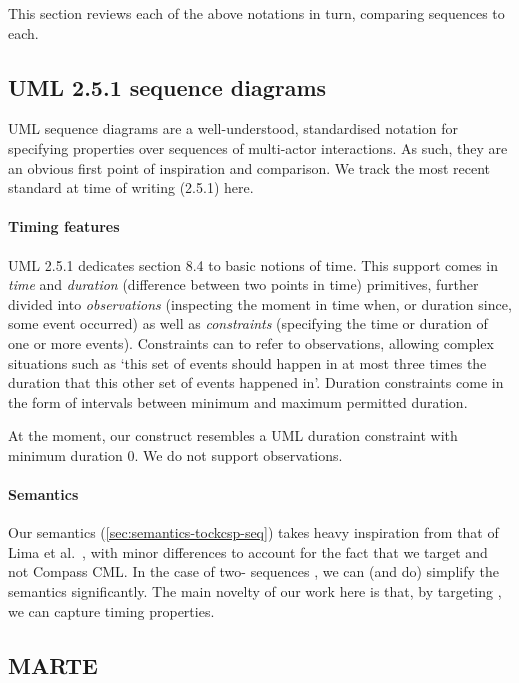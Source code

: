 
This section reviews each of the above notations in turn, comparing
\langname{} sequences to each.

\subsection{UML 2.5.1 sequence diagrams}

UML sequence diagrams are a well-understood, standardised notation for
specifying properties over sequences of multi-actor interactions.  As such, they
are an obvious first point of inspiration and comparison.  We track the most
recent standard at time of writing (2.5.1) here.

\paragraph{Timing features}
UML 2.5.1 dedicates section 8.4 to basic notions of time.  This
support comes in \emph{time} and \emph{duration} (difference between two points
in time) primitives, further divided into \emph{observations} (inspecting the
moment in time when, or duration since, some event occurred) as well as
\emph{constraints} (specifying the time or duration of one or more events).
Constraints can to refer to observations, allowing complex situations such as
`this set of events should happen in at most three times the duration that
this other set of events happened in'.  Duration constraints come in the
form of intervals between minimum and maximum permitted duration.

At the moment, our \mdeadlinestep{} construct resembles a UML duration
constraint with minimum duration \(0\).  We do not support observations.

\paragraph{Semantics}
Our semantics (\cref{sec:semantics-tockcsp-seq}) takes heavy inspiration from
that of Lima et al.~\cite{lima-semantics}, with minor differences to account
for the fact that we target \tockcsp{} and not Compass CML.  In the case of
two-\mactor{} sequences , we can (and do)
simplify the semantics significantly.
The main novelty of our work here is that, by targeting \tockcsp, we can capture
timing properties.

\subsection{MARTE}

